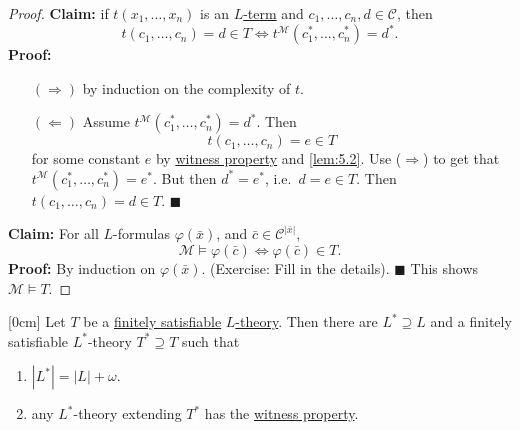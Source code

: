 \documentclass{article}
\let\models\vDash
\begin{document}
\begin{proof}
  \textbf{Claim:} if $t(x_1, \dotsc, x_n)$ is an \hyperlink{def:lterm}{$L$-term} and $c_1, \dotsc, c_n, d \in \mathscr{C}$, then
  \begin{equation*}
    t(c_1, \dotsc, c_n) = d \in T \iff t^\mathcal{M}(c_1^*, \dotsc, c_n^*) = d^*.
  \end{equation*}
  \textbf{Proof:}
  \begin{itemize}
    \item [$(\Rightarrow)$] by induction on the complexity of $t$.
    \item [$(\Leftarrow)$] Assume $t^\mathcal{M}(c_1^*, \dotsc, c_n^*) = d^*$.
    Then
    \begin{equation*}t(c_1, \dotsc, c_n) = e \in T\end{equation*}
    for some constant $e$ by \hyperlink{def:wp}{witness property} and \cref{lem:5.2}.
    Use ($\Rightarrow$) to get that $t^\mathcal{M}(c_1^*, \dotsc, c_n^*) = e^*$.
    But then $d^* = e^*$, i.e.\ $d = e \in T$.
    Then $t(c_1, \dotsc, c_n) = d \in T$. $\blacksquare$
  \end{itemize}

  \textbf{Claim:} For all $L$-formulas $\varphi(\bar{x})$, and $\bar{c} \in \mathscr{C}^{|\bar{x}|}$,
  \begin{equation*}
    \mathcal{M} \models \varphi(\bar{c}) \iff \varphi(\bar{c}) \in T.
  \end{equation*}
  \textbf{Proof:} By induction on $\varphi(\bar{x})$. (Exercise: Fill in the details).  $\blacksquare$
  This shows $\mathcal{M} \models T$.
\end{proof}
\begin{nlemma}\label{lem:5.4}
  [0cm]
  Let $T$ be a \hyperlink{def:fs}{finitely satisfiable} \hyperlink{def:ltheory}{$L$-theory}.
  Then there are $L^* \supseteq L$ and a finitely satisfiable $L^*$-theory $T^* \supseteq T$ such that
  \begin{enumerate}[label=(\roman*)]
    \item $|L^*| = |L| + \omega$.
    \item any $L^*$-theory extending $T^*$ has the \hyperlink{def:wp}{witness property}.
  \end{enumerate}
\end{nlemma}
\end{document}
